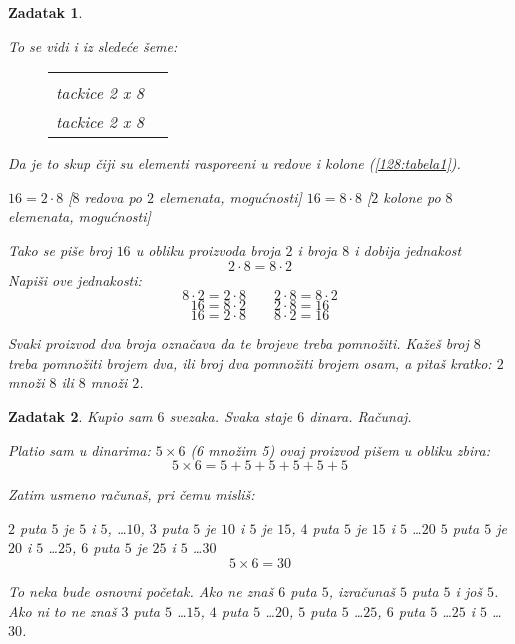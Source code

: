 \documentclass[a4paper,12pt]{book}
\newtheorem{zad}{Zadatak}
\newcommand{\Placeholder}[2][(10, 10)]
{
    \begin{tikzpicture}
        \draw[help lines] (0, 0) grid #1;
        \pgfgetlastxy{\x}{\y}
        \node[rotate=-25, align=center] at (\x / 2, \y / 2) {{\Huge Placeholder} \\  #2};
    \end{tikzpicture}
}
\begin{document}
\begin{zad}
\begin{enumerate}
            To se vidi i iz slede\' ce \v seme:
            \begin{figure}
            \begin{tabular}{c c}
                \Placeholder[(2, 8)]{tackice 2 x 8}
                &
                \Placeholder[(2, 8)]{tackice 2 x 8}
            \end{tabular}
            \end{figure}
            Da je to skup \v ciji su elementi raspore\dj eni u redove i kolone (\ref{128:tabela1}).

            $16 = 2 \cdot 8$ [$8$ redova po $2$ elemenata, mogu\' cnosti]
            $16 = 8 \cdot 8$ [$2$ kolone po $8$ elemenata, mogu\' cnosti]

            Tako se pi\v se broj $16$ u obliku proizvoda broja $2$ i broja $8$ i dobija jednakost
            $$2 \cdot 8 = 8 \cdot 2$$
            Napi\v si ove jednakosti:
            $$8 \cdot 2 = 2 \cdot 8 \qquad 2 \cdot 8 = 8 \cdot 2$$
            $$16 = 8 \cdot 2 \qquad 2 \cdot 8 = 16$$
            $$16 = 2 \cdot 8 \qquad 8 \cdot 2 = 16$$

            Svaki proizvod dva broja ozna\v cava da te brojeve treba pomno\v ziti. Ka\v ze\v s broj $8$ treba 
            pomno\v ziti brojem dva, ili broj dva pomno\v ziti brojem osam, a pita\v s kratko:
            $2$ mno\v zi $8$ ili $8$ mno\v zi $2$.
        \end{enumerate}
    \end{zad}
    \begin{zad}
        Kupio sam $6$ svezaka. Svaka staje $6$ dinara. Ra\v cunaj.

        Platio sam u dinarima: $5 \times 6$ (6 mno\v zim 5)
        ovaj proizvod pi\v sem u obliku zbira:
        $$5 \times 6 = 5 + 5 + 5 + 5 + 5 + 5$$

        Zatim usmeno ra\v cuna\v s, pri \v cemu misli\v s:

        $2$ puta $5$ je $5$ i $5$, \dots $10$, $3$ puta $5$ je $10$ i $5$ je $15$, $4$ puta $5$ je $15$ i $5$ \dots $20$
        $5$ puta $5$ je $20$ i $5$ \dots $25$, $6$ puta $5$ je $25$ i $5$ \dots $30$
        $$5 \times 6 = 30$$

        To neka bude osnovni po\v cetak. Ako ne zna\v s $6$ puta $5$, izra\v cuna\v s $5$ puta $5$ i jo\v s $5$. Ako ni to ne
        zna\v s $3$ puta $5$ \dots $15$, $4$ puta $5$ \dots $20$, $5$ puta $5$ \dots $25$, $6$ puta $5$ \dots $25$ i $5$ \dots $30$.
    \end{zad}
\end{document}
